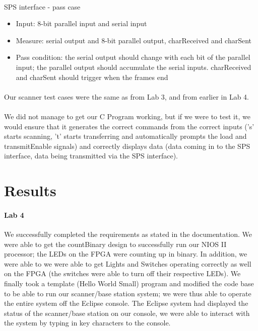 \documentclass{article}
\begin{document}
    \paragraph{} SPS interface - pass case
    \begin{itemize}
      \item Input: 8-bit parallel input and serial input
      \item Measure: serial output and 8-bit parallel output, charReceived and charSent
      \item Pass condition: the serial output should change with each bit of the parallel input; the parallel output should accumulate the serial inputs. charReceived and charSent should trigger when the frames end
    \end{itemize}

    \paragraph{} Our scanner test cases were the same as from Lab 3, and from earlier in Lab 4.

    \paragraph{} We did not manage to get our C Program working, but if we were to test it, we would ensure that it generates the correct commands from the correct inputs ('s' starts scanning, 't' starts transferring and automatically prompts the load and transmitEnable signals) and correctly displays data (data coming in to the SPS interface, data being transmitted via the SPS interface).


\section{Results}
  \paragraph{Lab 4} We successfully completed the requirements as stated in the documentation. We were able to get the countBinary design to successfully run our NIOS II processor; the LEDs on the FPGA were counting up in binary. In addition, we were able to we were able to get Lights and Switches operating correctly as well on the FPGA (the switches were able to turn off their respective LEDs). We finally took a template (Hello World Small) program and modified the code base to be able to run our scanner/base station system; we were thus able to operate the entire system off the Eclipse console. The Eclipse system had displayed the status of the scanner/base station on our console, we were able to interact with the system by typing in key characters to the console.
\end{document}
